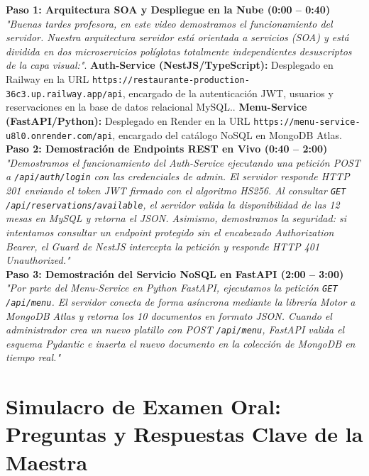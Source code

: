 \documentclass[12pt,a4paper]{article}
\begin{document}
\begin{tcolorbox}[title=Guión Explicativo para el Video del SERVIDOR (Paso a Paso)]
\textbf{Paso 1: Arquitectura SOA y Despliegue en la Nube (0:00 -- 0:40)}\newline
\textit{"Buenas tardes profesora, en este video demostramos el funcionamiento del servidor. Nuestra arquitectura servidor está orientada a servicios (SOA) y está dividida en dos microservicios políglotas totalmente independientes desuscriptos de la capa visual:"}. \textbf{Auth-Service (NestJS/TypeScript):} Desplegado en Railway en la URL \texttt{https://restaurante-production-36c3.up.railway.app/api}, encargado de la autenticación JWT, usuarios y reservaciones en la base de datos relacional MySQL.. \textbf{Menu-Service (FastAPI/Python):} Desplegado en Render en la URL \texttt{https://menu-service-u8l0.onrender.com/api}, encargado del catálogo NoSQL en MongoDB Atlas.\\[8pt]

\textbf{Paso 2: Demostración de Endpoints REST en Vivo (0:40 -- 2:00)}\newline
\textit{"Demostramos el funcionamiento del Auth-Service ejecutando una petición POST a \texttt{/api/auth/login} con las credenciales de admin. El servidor responde HTTP 201 enviando el token JWT firmado con el algoritmo HS256. Al consultar \texttt{GET /api/reservations/available}, el servidor valida la disponibilidad de las 12 mesas en MySQL y retorna el JSON. Asimismo, demostramos la seguridad: si intentamos consultar un endpoint protegido sin el encabezado Authorization Bearer, el Guard de NestJS intercepta la petición y responde HTTP 401 Unauthorized."}\\[8pt]

\textbf{Paso 3: Demostración del Servicio NoSQL en FastAPI (2:00 -- 3:00)}\newline
\textit{"Por parte del Menu-Service en Python FastAPI, ejecutamos la petición \texttt{GET /api/menu}. El servidor conecta de forma asíncrona mediante la librería Motor a MongoDB Atlas y retorna los 10 documentos en formato JSON. Cuando el administrador crea un nuevo platillo con POST \texttt{/api/menu}, FastAPI valida el esquema Pydantic e inserta el nuevo documento en la colección de MongoDB en tiempo real."}
\end{tcolorbox}

\section{Simulacro de Examen Oral: Preguntas y Respuestas Clave de la Maestra}
\end{document}
